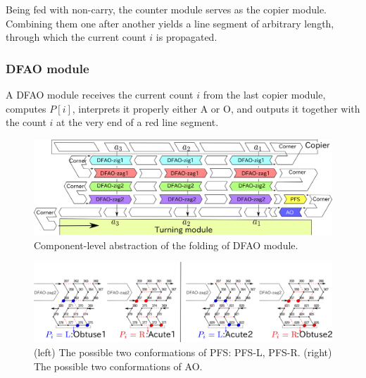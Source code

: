 Being fed with non-carry, the counter module serves as the copier module. 
Combining them one after another yields a line segment of arbitrary length, through which the current count $i$ is propagated. 


			\subsubsection{DFAO module}


A DFAO module receives the current count $i$ from the last copier module, computes $P[i]$, interprets it properly either A or O, and outputs it together with the count $i$ at the very end of a red line segment. 

\begin{figure}[h]
\includegraphics[width=\linewidth]{pic/abst_DFAO.png}
\caption{Component-level abstraction of the folding of DFAO module.}
\label{fig:abst_dfao}
\end{figure}


\begin{figure}[h]
\includegraphics[width=\linewidth]{pic/PFS.png}
\caption{(left) The possible two conformations of PFS: PFS-L, PFS-R. (right) The possible two conformations of AO.}
\label{fig:PFS}
\end{figure}


